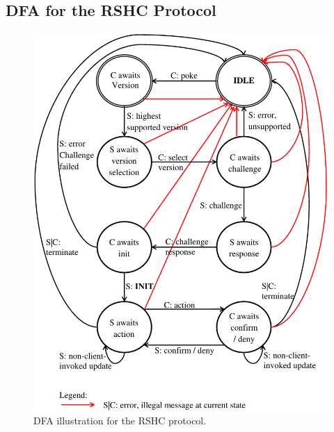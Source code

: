 \begin{appendices}

\section{DFA for the RSHC Protocol}
\label{app:dfa}

\begin{figure}[h]
  \centering
  \includegraphics[width=4.95in]{figures/dfa.pdf}
  \caption{DFA illustration for the RSHC protocol.}
  \label{fig:dfa:dfa}
\end{figure}

\end{appendices} 